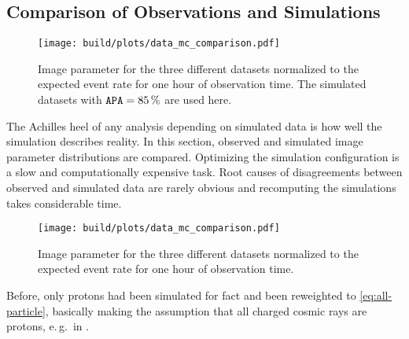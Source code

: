 \subsection{Comparison of Observations and Simulations}

\begin{figure}
  \centering
  \texttt{[image: build/plots/data\_mc\_comparison.pdf]}
  \caption{%
    Image parameter  for the three different datasets normalized to
    the expected event rate for one hour of observation time.
    The simulated datasets with $\mathtt{APA} = \SI{85}{\percent}$  are used here.
  }\label{fig:data-mc-size}
\end{figure}


\noindent The Achilles heel of any analysis depending on simulated data is
how well the simulation describes reality.
In this section, observed and simulated image parameter distributions are compared.
Optimizing the simulation configuration is a slow and computationally expensive 
task.
Root causes of disagreements between observed and simulated data are rarely obvious
and recomputing the simulations takes considerable time.

\begin{figure}
  \centering
  \texttt{[image: build/plots/data\_mc\_comparison.pdf]}
  \caption{%
    Image parameter  for the three different datasets normalized to
    the expected event rate for one hour of observation time.
  }\label{fig:data-mc-length}
\end{figure}

Before, only protons had been simulated for \gls{fact} and been
reweighted to \eqref{eq:all-particle}, basically making the assumption
that all charged cosmic rays are protons, e.\,g.\ in \cite{phd-temme}.


